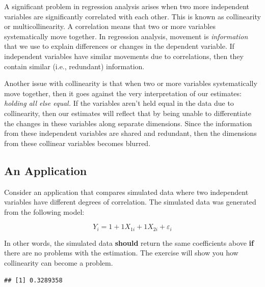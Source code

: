 \documentclass[
]{book}
\newenvironment{Shaded}{\begin{snugshade}}{\end{snugshade}}
\newcommand{\CommentTok}[1]{\textcolor[rgb]{0.56,0.35,0.01}{\textit{#1}}}
\newcommand{\FunctionTok}[1]{\textcolor[rgb]{0.00,0.00,0.00}{#1}}
\newcommand{\NormalTok}[1]{#1}
\newcommand{\SpecialCharTok}[1]{\textcolor[rgb]{0.00,0.00,0.00}{#1}}
\begin{document}
A significant problem in regression analysis arises when two more independent variables are significantly correlated with each other. This is known as collinearity or multicollinearity. A correlation means that two or more variables systematically move together. In regression analysis, movement is \emph{information} that we use to explain differences or changes in the dependent variable. If independent variables have similar movements due to correlations, then they contain similar (i.e., redundant) information.

Another issue with collinearity is that when two or more variables systematically move together, then it goes against the very interpretation of our estimates: \emph{holding all else equal.} If the variables aren't held equal in the data due to collinearity, then our estimates will reflect that by being unable to differentiate the changes in these variables along separate dimensions. Since the information from these independent variables are shared and redundant, then the dimensions from these collinear variables becomes blurred.

\hypertarget{an-application-1}{%
\subsection{An Application}\label{an-application-1}}

Consider an application that compares simulated data where two independent variables have different degrees of correlation. The simulated data was generated from the following model:

\[Y_i = 1 + 1 X_{1i} + 1 X_{2i} + \varepsilon_i\]

In other words, the simulated data \textbf{should} return the same coefficients above \textbf{if} there are no problems with the estimation. The exercise will show you how collinearity can become a problem.

\begin{Shaded}
\end{Shaded}

\begin{verbatim}
## [1] 0.3289358
\end{verbatim}
\end{document}

